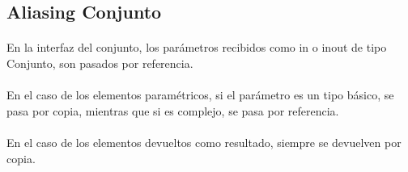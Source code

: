 \subsection*{Aliasing Conjunto}

\paragraph{}
En la interfaz del conjunto, los par\'ametros recibidos como in o inout de tipo Conjunto, son pasados por referencia.

\paragraph{}
En el caso de los elementos param\'etricos, si el par\'ametro es un tipo b\'asico, se pasa por copia, mientras que si es complejo, se pasa por referencia.

\paragraph{}
En el caso de los elementos devueltos como resultado, siempre se devuelven por copia.
